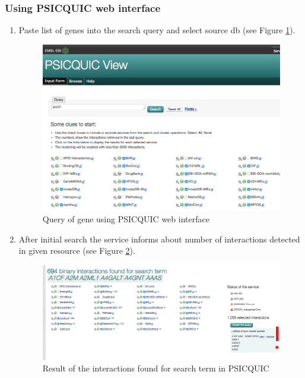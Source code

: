 \documentclass[11pt, oneside]{article}   	%
\begin{document}
\subsubsection{Using PSICQUIC web interface}


\begin{enumerate}
   \item Paste list of genes into the search query and select source db (see Figure \ref{fig:psicquic1}).


   \begin{figure}[!h]
	\centering
	\includegraphics[width=\textwidth]{psicquic1}
	\caption{Query of gene using PSICQUIC web interface}
	\label{fig:psicquic1}
   \end{figure}

   \item After initial search the service informs about number of interactions detected in given resource (see Figure \ref{fig:psicquic2}).

   \begin{figure}[!h]
	\centering
	\includegraphics[width=\textwidth]{psicquic2}
	\caption{Result of the interactions found for search term in PSICQUIC}
	\label{fig:psicquic2}
   \end{figure}
   

\end{enumerate}
\end{document}
